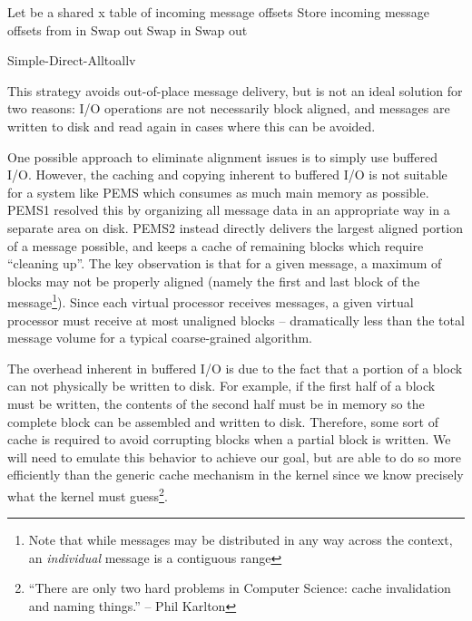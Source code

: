 \documentclass[12pt]{carletoncsthesis}
\begin{document}
\begin{algorithm}[h]
\BlankLine
Let  be a shared  x  table of incoming message offsets
\BlankLine
{}
	Store incoming message offsets from  in \;
	Swap out\;
\BlankLine{}
\BlankLine
{}
	Swap in\;
	Swap out\;
\BlankLine{}\BlankLine
\caption{\sc Simple-Direct-Alltoallv}
\label{alltoall-buf-seq}
\end{algorithm}

This strategy avoids out-of-place message delivery, but is not an ideal
solution for two reasons: I/O operations are not necessarily block aligned, and
messages are written to disk and read again in cases where this can be avoided.

One possible approach to eliminate alignment issues is to simply use
buffered I/O.  However, the caching and copying inherent to buffered I/O is not
suitable for a system like PEMS which consumes as much main memory as possible.
PEMS1 resolved this by organizing all message data in an appropriate way in a
separate area on disk.  PEMS2 instead directly delivers the largest aligned
portion of a message possible, and keeps a cache of remaining blocks which
require ``cleaning up''.  The key observation is that for a given message, a
maximum of  blocks may not be properly aligned (namely the first and last
block of the message\footnote{Note that while messages may be distributed
in any way across the context, an {\em individual} message is a contiguous
range}).  Since each virtual processor receives  messages, a given virtual
processor must receive at most  unaligned blocks -- dramatically
less than the total message volume for a typical coarse-grained algorithm.

The overhead inherent in buffered I/O is due to the fact that a portion of
a block can not physically be written to disk.  For example, if the first
half of a block must be written, the contents of the second half must be in
memory so the complete block can be assembled and written to disk.  Therefore,
some sort of cache is required to avoid corrupting blocks when a partial block
is written.  We will need to emulate this behavior to achieve our goal, but
are able to do so more efficiently than the generic cache mechanism in the
kernel since we know precisely what the kernel must guess\footnote{``There
are only two hard problems in Computer Science: cache invalidation and naming
things.'' -- Phil Karlton}.
\end{document}
